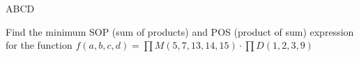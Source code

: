 \maketitle


%
\begin{example}
  \begin{Karnaugh}{AB}{CD}
  \end{Karnaugh}
\end{example}%
% 

\begin{prob}[10 marks]
  Find the minimum SOP (sum of products) and POS (product of sum) expression for
  the function $f(a,b,c,d) = \prod M(5, 7, 13, 14, 15) \cdot \prod D(1, 2, 3, 9)$
\end{prob}%
% 
